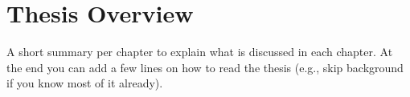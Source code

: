 
\section{Thesis Overview}
\label{section:introduction:overview}

A short summary per chapter to explain what is discussed in each chapter. At the end you can add a few lines on how to read the thesis (e.g., skip background if you know most of it already).